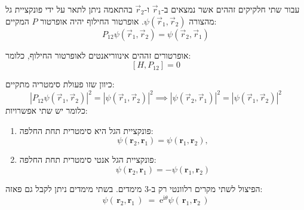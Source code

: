 \documentclass{tstextbook}
\begin{document}
\begin{definition}
עבור שתי חלקיקים זההים אשר נמצאים ב-\(\vec{r}_{1}\) ו-\(\vec{r}_{2}\) בהתאמה ניתן לתאר על ידי פונקציית גל מהצורה \(\psi\left( \vec{r}_{1},\vec{r}_{2} \right)\). אופרטור החילוף יהיה אופרטור \(P\) המקיים:
$$P_{12}\psi\left( \vec{r}_{1},\vec{r}_{2} \right)=\psi\left( \vec{r}_{2},\vec{r}_{1} 
\right)$$

\end{definition}
\begin{proposition}
אופרטורים זההים אינווריאנטים לאופרטור החילוף, כלומר:
$$[H,P_{12}]=0$$

\end{proposition}
\begin{corollary}
כיוון שזו פעולת סימטריה מתקיים:
$$\left\lvert  P_{12}\psi\left( \vec{r}_{1},\vec{r}_{2} \right)  \right\rvert^{2} =\left\lvert  \psi\left( \vec{r}_{1},\vec{r}_{2} \right)  \right\rvert ^{2}\implies\left\lvert  \psi\left( \vec{r}_{2},\vec{r}_{1} \right)  \right\rvert^{2} =\left\lvert  \psi\left( \vec{r}_{1},\vec{r}_{2} \right)  \right\rvert ^{2}$$
כלומר יש שתי אפשרויות:

  \begin{enumerate}
    \item פונקציית הגל היא סימטרית תחת החלפה: 
$$\psi(\mathbf{r}_{2},\mathbf{r}_{1})=\psi(\mathbf{r}_{1},\mathbf{r}_{2}),$$


    \item פונקציית הגל אנטי סימטרית תחת החלפה: 
$$\psi(\mathbf{r}_{2},\mathbf{r}_{1})=-\psi(\mathbf{r}_{1},\mathbf{r}_{2})$$


  \end{enumerate}
\end{corollary}
\begin{remark}
הפיצול לשתי מקרים רלוונטי רק ב-3 מימדים. בשתי מימדים ניתן לקבל גם פאזה:
$$\psi(\,\mathbf{r}_{2},\mathbf{r}_{1}\,)\;=\;\mathrm{e}^{\mathrm{i}\theta}\psi(\,\mathbf{r}_{1},\mathbf{r}_{2}\,)$$

\end{remark}
\end{document}
